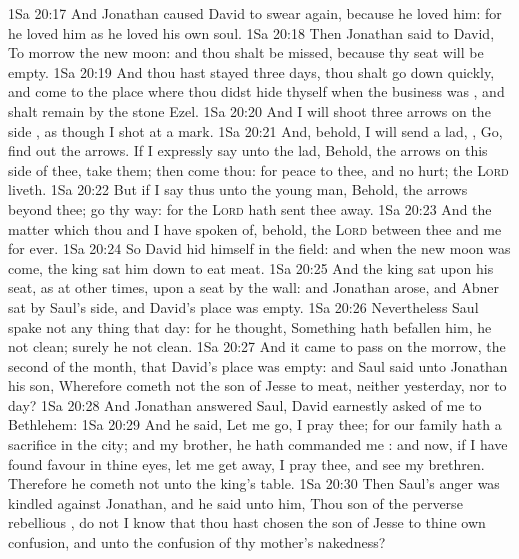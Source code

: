 \vs 1Sa 20:17 And Jonathan caused David to swear again, because he loved him: for he loved him as he loved his own soul.
\vs 1Sa 20:18 Then Jonathan said to David, To morrow  the new moon: and thou shalt be missed, because thy seat will be empty.
\vs 1Sa 20:19 And  thou hast stayed three days,  thou shalt go down quickly, and come to the place where thou didst hide thyself when the business was , and shalt remain by the stone Ezel.
\vs 1Sa 20:20 And I will shoot three arrows on the side , as though I shot at a mark.
\vs 1Sa 20:21 And, behold, I will send a lad, , Go, find out the arrows. If I expressly say unto the lad, Behold, the arrows  on this side of thee, take them; then come thou: for  peace to thee, and no hurt;  the \textsc{Lord} liveth.
\vs 1Sa 20:22 But if I say thus unto the young man, Behold, the arrows  beyond thee; go thy way: for the \textsc{Lord} hath sent thee away.
\vs 1Sa 20:23 And  the matter which thou and I have spoken of, behold, the \textsc{Lord}  between thee and me for ever.
\vs 1Sa 20:24 So David hid himself in the field: and when the new moon was come, the king sat him down to eat meat.
\vs 1Sa 20:25 And the king sat upon his seat, as at other times,  upon a seat by the wall: and Jonathan arose, and Abner sat by Saul's side, and David's place was empty.
\vs 1Sa 20:26 Nevertheless Saul spake not any thing that day: for he thought, Something hath befallen him, he  not clean; surely he  not clean.
\vs 1Sa 20:27 And it came to pass on the morrow,  the second  of the month, that David's place was empty: and Saul said unto Jonathan his son, Wherefore cometh not the son of Jesse to meat, neither yesterday, nor to day?
\vs 1Sa 20:28 And Jonathan answered Saul, David earnestly asked  of me  to Bethlehem:
\vs 1Sa 20:29 And he said, Let me go, I pray thee; for our family hath a sacrifice in the city; and my brother, he hath commanded me : and now, if I have found favour in thine eyes, let me get away, I pray thee, and see my brethren. Therefore he cometh not unto the king's table.
\vs 1Sa 20:30 Then Saul's anger was kindled against Jonathan, and he said unto him, Thou son of the perverse rebellious , do not I know that thou hast chosen the son of Jesse to thine own confusion, and unto the confusion of thy mother's nakedness?
